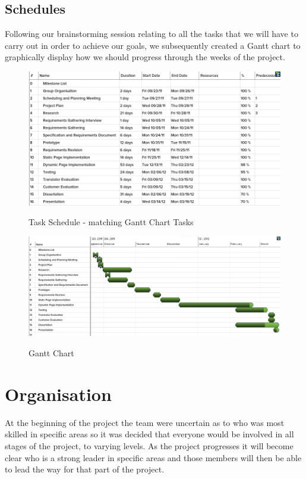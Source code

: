 \documentclass{l3proj}
\begin{document}
\subsection{Schedules}
Following our brainstorming session relating to all the tasks that we will have to carry out in order to achieve our goals, we subsequently created a Gantt chart to graphically
display how we should progress through the weeks of the project.
\begin{figure}
\begin{center}
\label{fig:gantttasks}
\includegraphics[scale=0.5, angle=90]{images/tasks}
\caption{\small{Task Schedule - matching Gantt Chart Tasks}}
\end{center}
\end{figure}

\begin{figure}
\begin{center}
\label{fig:ganttchart}
\includegraphics[scale=0.5, angle=90]{gantt}
\caption{\small{Gantt Chart}}
\end{center}
\end{figure}

\newpage
\section{Organisation}
\label{sect:org}
At the beginning of the project the team were uncertain as to who was most skilled in specific areas so it was decided that everyone would be involved in all stages of the project, to varying levels. As the project progresses it will become clear who is a strong leader in specific areas and those members will then be able to lead the way for that part of the project.
\end{document}
